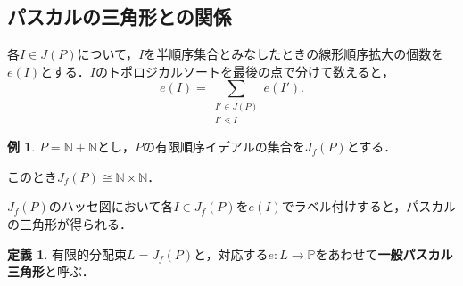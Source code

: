 \documentclass[xelatex,ja=standard,a4paper,14pt,everyparhook=compat]{bxjsarticle}
\newcommand{\bbN}{\mathbb{N}}
\newcommand{\bbP}{\mathbb{P}}
\DeclareMathOperator{\conv}{conv}
\theoremstyle{definition}
\newtheorem*{example*}{例}
\newtheorem*{definition*}{定義}
\newtheorem{proposition}[theorem]{命題}
\begin{document}
\subsection{パスカルの三角形との関係}

各$I \in J(P)$について，$I$を半順序集合とみなしたときの線形順序拡大の個数を$e(I)$とする．$I$のトポロジカルソートを最後の点で分けて数えると， \begin{equation*}
    e(I) = \sum_{\substack{I' \in J(P) \\ I' \lessdot I}} e(I').
\end{equation*}

\begin{example*}
    $P = \bbN + \bbN$とし，$P$の有限順序イデアルの集合を$J_f(P)$とする．

    このとき$J_f(P) \cong \bbN \times \bbN$．

    $J_f(P)$のハッセ図において各$I \in J_f(P)$を$e(I)$でラベル付けすると，パスカルの三角形が得られる．
\end{example*}

\begin{definition*}
    有限的分配束$L = J_f(P)$と，対応する$e:L \to \bbP$をあわせて\textbf{一般パスカル三角形}と呼ぶ．
\end{definition*}


\end{document}
